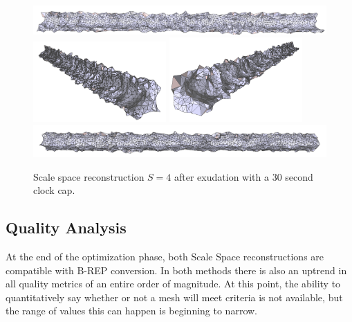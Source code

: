 \documentclass[12pt]{drexelthesis}
\let\Oldsubsection\subsection
\renewcommand{\subsection}{\FloatBarrier\Oldsubsection}
\begin{document}
\begin{figure}[!ht]
	\centering
		\includegraphics[width=5in]{simulated-lab-scan/2cmnoise/optimizedNeat/scalespace4everything00.png}
		\includegraphics[width=2in]{simulated-lab-scan/2cmnoise/optimizedNeat/scalespace4everything01.png}
		\includegraphics[width=2in]{simulated-lab-scan/2cmnoise/optimizedNeat/scalespace4everything02.png}
		\includegraphics[width=5in]{simulated-lab-scan/2cmnoise/optimizedNeat/scalespace4everything03.png}
		\caption[Scale space reconstruction $S = 4$ after exudation with a 30 second clock cap]{\centering Scale space reconstruction $S = 4$ after exudation with a 30 second clock cap.}
	\label{2cmnoise:scalespace4everything}
\end{figure}

\subsection{Quality Analysis}

At the end of the optimization phase, both Scale Space reconstructions are compatible with B-REP conversion. In both methods there is also an uptrend in all quality metrics of an entire order of magnitude. At this point, the ability to quantitatively say whether or not a mesh will meet criteria is not available, but the range of values this can happen is beginning to narrow.
\end{document}
